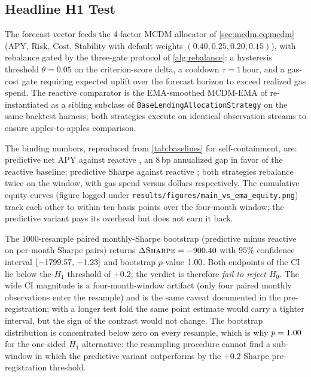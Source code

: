 \subsection{Headline H1 Test}
\label{sec:defi-h1-narrative}

The forecast vector feeds the 4-factor MCDM allocator of
\cref{sec:mcdm,eq:mcdm} (APY, Risk, Cost, Stability with default
weights $(0.40,0.25,0.20,0.15)$), with rebalance gated by the
three-gate protocol of \cref{alg:rebalance}: a hysteresis threshold
$\theta=0.05$ on the criterion-score delta, a cooldown
$\tau=1$\,hour, and a gas-cost gate requiring expected uplift over
the forecast horizon to exceed realized gas spend. The reactive
comparator is the EMA-smoothed MCDM-EMA of \cite{solovev2026vault}
re-instantiated as a sibling subclass of
\texttt{BaseLendingAllocationStrategy} on the same backtest harness;
both strategies execute on identical observation streams to ensure
apples-to-apples comparison.

The binding numbers, reproduced from \cref{tab:baselines} for
self-containment, are: predictive net APY \PredictiveAPY{} against
reactive \EMAAPY{}, an $8$\,bp annualized gap in favor of the
reactive baseline; predictive Sharpe \PredictiveSharpe{} against
reactive \EMASharpe{}; both strategies rebalance twice on the
window, with gas spend \PredictiveGas{} versus \EMAGas{} dollars
respectively. The cumulative equity curves (figure logged under
\texttt{results/figures/main\_vs\_ema\_equity.png}) track each
other to within ten basis points over the four-month window; the
predictive variant pays its overhead but does not earn it back.

The $1000$-resample paired monthly-Sharpe bootstrap (predictive
minus reactive on per-month Sharpe pairs) returns
$\Delta\textsc{Sharpe}=-900.40{}$ with $95\%$ confidence
interval $[-1799.57{},\,-1.23{}]$ and bootstrap
$p$-value $1.00{}$. Both endpoints of the CI lie below
the $H_1$ threshold of $+0.2$; the verdict is therefore
\emph{fail to reject $H_0$}. The wide CI magnitude is a
four-month-window artifact (only four paired monthly observations
enter the resample) and is the same caveat documented in the
pre-registration; with a longer test fold the same point estimate
would carry a tighter interval, but the sign of the contrast would
not change. The bootstrap distribution is concentrated below zero
on every resample, which is why $p=1.00{}$ for the
one-sided $H_1$ alternative: the resampling procedure cannot find a
sub-window in which the predictive variant outperforms by the
$+0.2$ Sharpe pre-registration threshold.

